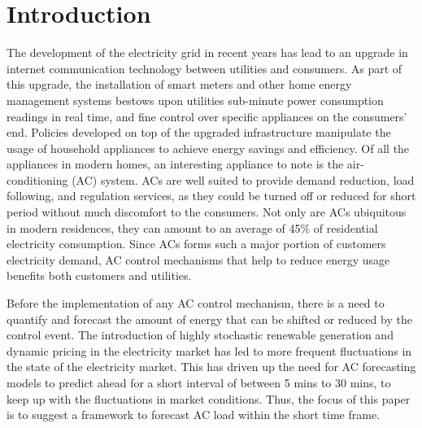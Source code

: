 \documentclass[conference]{IEEEtran}
\begin{document}
\section{Introduction}
The development of the electricity grid in recent years has lead to an upgrade in internet communication technology between utilities and consumers. As part of this upgrade, the installation of smart meters and other home energy management systems bestows upon utilities sub-minute power consumption readings in real time, and fine control over specific appliances on the consumers' end. Policies developed on top of the upgraded infrastructure manipulate the usage of household appliances to achieve energy savings and efficiency\cite{li2014}. Of all the appliances in modern homes, an interesting appliance to note is the air-conditioning (AC) system. ACs are well suited to provide demand reduction, load following, and regulation services, as they could be turned off or reduced for short period without much discomfort to the consumers. Not only are ACs ubiquitous in modern residences, they can amount to an average of 45\% of residential electricity consumption\cite{kalkan2012}. Since ACs forms such a major portion of customers electricity demand, AC control mechanisms that help to reduce energy usage benefits both customers and utilities\cite{Yoon2016,PacificGasandElectricCompany,peaksaver}.

Before the implementation of any AC control mechanism, there is a need to quantify and forecast the amount of energy that can be shifted or reduced by the control event. The introduction of highly stochastic renewable generation and dynamic pricing in the electricity market has led to more frequent fluctuations in the state of the electricity market. This has driven up the need for AC forecasting models to predict ahead for a short interval of between 5 mins to 30 mins, to keep up with the fluctuations in market conditions\cite{Chan2012}. Thus, the focus of this paper is to suggest a framework to forecast AC load within the short time frame. 
\end{document}
